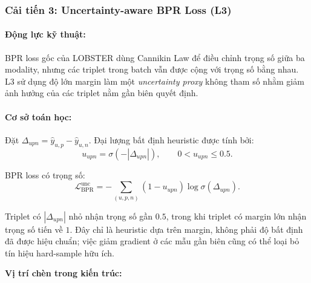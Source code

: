 \subsubsection{Cải tiến 3: Uncertainty-aware BPR Loss (L3)}

\paragraph{Động lực kỹ thuật:}
BPR loss gốc của LOBSTER dùng Cannikin Law để điều chỉnh trọng số giữa ba modality, nhưng các triplet trong batch vẫn được cộng với trọng số bằng nhau. L3 sử dụng độ lớn margin làm một \textit{uncertainty proxy} không tham số nhằm giảm ảnh hưởng của các triplet nằm gần biên quyết định.

\paragraph{Cơ sở toán học:}
Đặt $\Delta_{upn}=\hat y_{u,p}-\hat y_{u,n}$. Đại lượng bất định heuristic được tính bởi:
\begin{equation}
u_{upn}=\sigma\!\left(-|\Delta_{upn}|\right),
\qquad 0<u_{upn}\leq0.5.
\end{equation}

BPR loss có trọng số:
\begin{equation}
\mathcal{L}_{\text{BPR}}^{\text{unc}}
=-\sum_{(u,p,n)}(1-u_{upn})\log\sigma(\Delta_{upn}).
\end{equation}

Triplet có $|\Delta_{upn}|$ nhỏ nhận trọng số gần $0.5$, trong khi triplet có margin lớn nhận trọng số tiến về $1$. Đây chỉ là heuristic dựa trên margin, không phải độ bất định đã được hiệu chuẩn; việc giảm gradient ở các mẫu gần biên cũng có thể loại bỏ tín hiệu hard-sample hữu ích.

\par\medskip
\noindent\textbf{Vị trí chèn trong kiến trúc:}\par
\nopagebreak[4]


